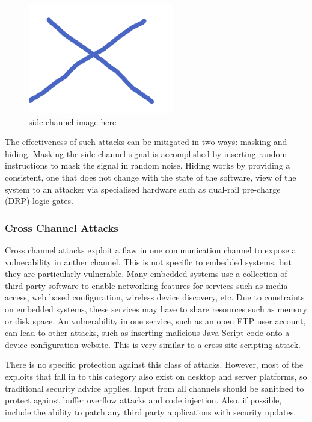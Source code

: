 \documentclass[final,conference,10pt]{IEEEtran}
\begin{document}
\begin{figure}[!t]
\centering
\includegraphics[width=2.5in]{topology}
\caption{side channel image here}
\label{fig:side_chan}
\end{figure}

The effectiveness of such attacks can be mitigated in two ways: masking and hiding.  Masking the side-channel signal is accomplished by inserting random instructions to mask the signal in random noise.  Hiding works by providing a consistent, one that does not change with the state of the software, view of the system to an attacker via specialised hardware such as dual-rail pre-charge (DRP) logic gates.\cite{papers??}

\subsubsection{Cross Channel Attacks}
Cross channel attacks exploit a flaw in one communication channel to expose a vulnerability in anther channel.  This is not specific to embedded systems, but they are particularly vulnerable.  Many embedded systems use a collection of third-party software to enable networking features for services such as media access, web based configuration, wireless device discovery, etc.  Due to constraints on embedded systems, these services may have to share resources such as memory or disk space.   An vulnerability in one service, such as an open FTP user account, can lead to other attacks, such as inserting malicious Java Script code onto a device configuration website.  This is very similar to a cross site scripting attack.

There is no specific protection against this class of attacks.  However, most of the exploits that fall in to this category also exist on desktop and server platforms, so traditional security advice applies.  Input from all channels should be sanitized to protect against buffer overflow attacks and code injection.  Also, if possible, include the ability to patch any third party applications with security updates. \cite{emerge ccs paper}
\end{document}
